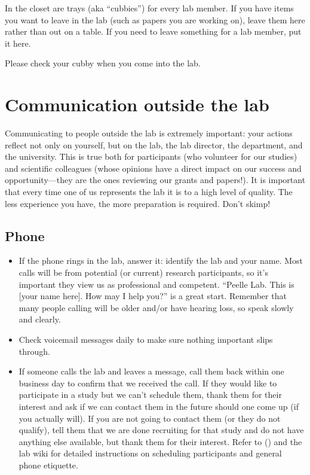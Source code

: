 \documentclass[letterpaper,12pt,oneside]{memoir}
\begin{document}
In the closet are trays (aka ``cubbies'') for every lab member. If you have items you want to leave in the lab (such as papers you are working on), leave them here rather than out on a table. If you need to leave something for a lab member, put it here.

Please check your cubby when you come into the lab.


\section{Communication outside the lab}

Communicating to people outside the lab is extremely important: your actions reflect not only on yourself, but on the lab, the lab director, the department, and the university. This is true both for participants (who volunteer for our studies) and scientific colleagues (whose opinions have a direct impact on our success and opportunity---they are the ones reviewing our grants and papers!). It is important that every time one of us represents the lab it is to a high level of quality. The less experience you have, the more preparation is required. Don't skimp!

\subsection{Phone}

\begin{itemize}
\item If the phone rings in the lab, answer it: identify the lab and your name. Most calls will be from potential (or current) research participants, so it's important they view us as professional and competent. ``Peelle Lab. This is [your name here]. How may I help you?'' is a great start. Remember that many people calling will be older and/or have hearing loss, so speak slowly and clearly.

\item Check voicemail messages daily to make sure nothing important slips through.

\item If someone calls the lab and leaves a message, call them back within one business day to confirm that we received the call. If they would like to participate in a study but we can't schedule them, thank them for their interest and ask if we can contact them in the future should one come up (if you actually will). If you are not going to contact them (or they do not qualify), tell them that we are done recruiting for that study and do not have anything else available, but thank them for their interest. Refer to  () and the lab wiki for detailed instructions on scheduling participants and general phone etiquette.

\end{itemize}
\end{document}
